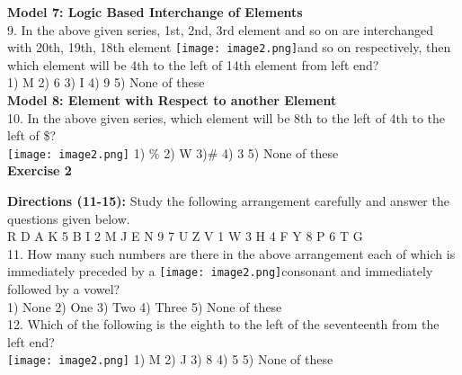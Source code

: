 \documentclass[
]{article}
\begin{document}
\textbf{Model 7: Logic Based Interchange of Elements}\\
9. In the above given series, 1st, 2nd, 3rd element and so on are interchanged with 20th, 19th, 18th element \texttt{[image: image2.png]}and so on respectively, then which element will be 4th to the left of 14th element from left end?\\
1) M \hspace{2mm}2) 6 \hspace{2mm}3) I \hspace{2mm}4) 9 \hspace{2mm}5) None of these\\

\textbf{Model 8: Element with Respect to another Element}\\
10. In the above given series, which element will be 8th to the left of 4th to the left of \$?\\
\texttt{[image: image2.png]}
1) \% \hspace{2mm}2) W \hspace{2mm}3)\# \hspace{2mm}4) 3 \hspace{2mm}5) None of these\\

\textbf{Exercise 2}

\textbf{Directions (11-15):} Study the following arrangement carefully and answer the questions given
below.\\
R D A K 5 B I 2 M J E N 9 7 U Z V 1 W 3 H 4 F Y 8 P 6 T G\\
11. How many such numbers are there in the above arrangement each of which is immediately preceded by a \texttt{[image: image2.png]}consonant and immediately followed by a vowel?\\
1) None \hspace{2mm}2) One \hspace{2mm}3) Two \hspace{2mm}4) Three \hspace{2mm}5) None of these\\

12. Which of the following is the eighth to the left of the seventeenth from the left end?\\
\texttt{[image: image2.png]}
1) M \hspace{2mm}2) J \hspace{2mm}3) 8 \hspace{2mm}4) 5 \hspace{2mm}5) None of these\\
\end{document}
